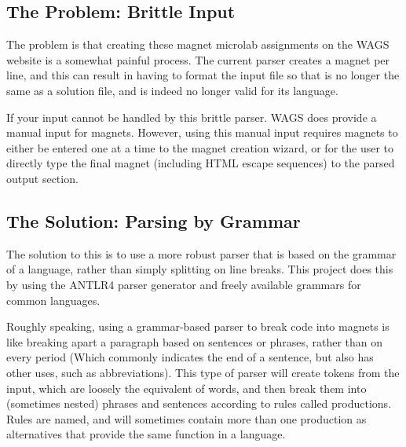 \documentclass[letter,10pt]{article}
\begin{document}

\subsection{The Problem: Brittle Input}

The problem is that creating these magnet microlab assignments on the 
WAGS website is a somewhat painful process. The current parser creates 
a magnet per line, and this can result in having to format the input 
file so that is no longer the same as a solution file, and is indeed no 
longer valid for its language.


If your input cannot be handled by this brittle parser. WAGS does 
provide a manual input for magnets. However, using this manual input 
requires magnets to either be entered one at a time to the magnet 
creation wizard, or for the user to directly type the final magnet 
(including HTML escape sequences) to the parsed output section. 


\subsection{The Solution: Parsing by Grammar}

The solution to this is to use a more robust parser that is based on 
the grammar of a language, rather than simply splitting on line breaks. 
This project does this by using the ANTLR4 parser 
generator\cite{antlr-reference} and freely available grammars for 
common languages\cite{antlr-grammars-project}.

Roughly speaking, using a grammar-based parser to break code into 
magnets is like breaking apart a paragraph based on sentences or 
phrases, rather than on every period (Which commonly indicates the end 
of a sentence, but also has other uses, such as abbreviations). This 
type of parser will create tokens from the input, which are loosely the 
equivalent of words, and then break them into (sometimes nested) 
phrases and sentences according to rules called productions. Rules are 
named, and will sometimes contain more than one production as 
alternatives that provide the same function in a language. 
\end{document}
